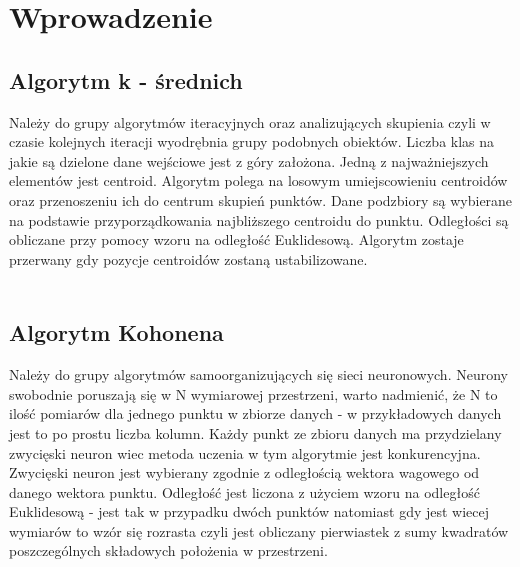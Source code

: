 \documentclass{classrep}
\begin{document}
    \section{Wprowadzenie}
    {
        \subsection{Algorytm k - średnich }
        {
            Należy do grupy algorytmów iteracyjnych oraz analizujących skupienia czyli w czasie kolejnych iteracji wyodrębnia grupy
            podobnych obiektów. Liczba klas na jakie są dzielone dane wejściowe jest z góry założona. Jedną z najważniejszych
            elementów jest centroid. Algorytm polega na losowym umiejscowieniu centroidów oraz przenoszeniu ich do centrum
            skupień punktów. Dane podzbiory są wybierane na podstawie przyporządkowania najbliższego centroidu do punktu.
            Odległości są obliczane przy pomocy wzoru na odległość Euklidesową. Algorytm zostaje przerwany gdy pozycje
            centroidów zostaną ustabilizowane.\\\\
        }

        \subsection{Algorytm Kohonena}
        {
            Należy do grupy algorytmów samoorganizujących się sieci neuronowych. Neurony swobodnie poruszają się w N wymiarowej
            przestrzeni, warto nadmienić, że N to ilość pomiarów dla jednego punktu w zbiorze danych - w przykładowych danych
            jest to po prostu liczba kolumn. Każdy punkt ze zbioru danych ma przydzielany zwycięski neuron wiec metoda uczenia
            w tym algorytmie jest konkurencyjna. Zwycięski neuron jest wybierany zgodnie z odległością wektora wagowego od danego
            wektora punktu. Odległość jest liczona z użyciem wzoru na odległość Euklidesową - jest tak w przypadku dwóch punktów
            natomiast gdy jest wiecej wymiarów to wzór się rozrasta czyli jest obliczany pierwiastek z sumy kwadratów
            poszczególnych składowych położenia w przestrzeni. \\

}}
\end{document}
